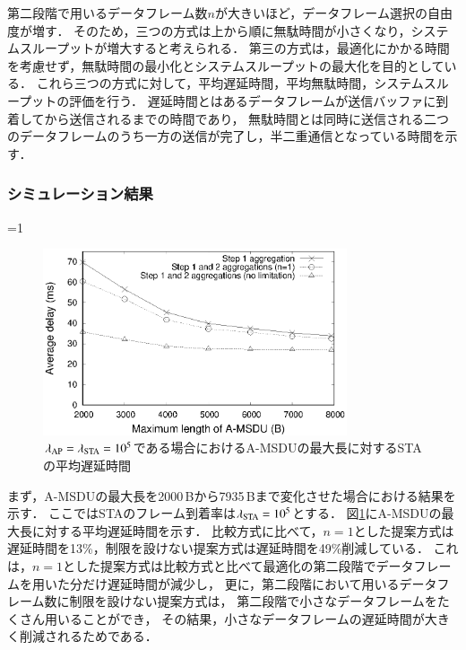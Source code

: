 \documentclass[master]{kuisthesis}		%
\newcounter{flagFig}
\begin{document}
			第二段階で用いるデータフレーム数$n$が大きいほど，データフレーム選択の自由度が増す．
			そのため，三つの方式は上から順に無駄時間が小さくなり，システムスループットが増大すると考えられる．
			第三の方式は，最適化にかかる時間を考慮せず，無駄時間の最小化とシステムスループットの最大化を目的としている．
			これら三つの方式に対して，平均遅延時間，平均無駄時間，システムスループットの評価を行う．
			遅延時間とはあるデータフレームが送信バッファに到着してから送信されるまでの時間であり，
			無駄時間とは同時に送信される二つのデータフレームのうち一方の送信が完了し，半二重通信となっている時間を示す．

		\subsubsection{シミュレーション結果}
			\ifnum\value{flagFig}=1 {\begin{figure}[htbp]
				\begin{center}
					\includegraphics[width=0.8\textwidth]{graph/dly_max.eps}
					\caption{$\lambda_{\rm AP}=\lambda_{\rm STA}=10^5$である場合におけるA-MSDUの最大長に対するSTAの平均遅延時間}
					\label{fig:dly_max}
				\end{center}
			\end{figure}}\fi
			まず，A-MSDUの最大長を2000\,Bから7935\,Bまで変化させた場合における結果を示す．
			ここではSTAのフレーム到着率は$\lambda_{\rm STA}=10^5$とする．
			図\ref{fig:dly_max}にA-MSDUの最大長に対する平均遅延時間を示す．
			比較方式に比べて，$n=1$とした提案方式は遅延時間を13\%，制限を設けない提案方式は遅延時間を49\%削減している．
			これは，$n=1$とした提案方式は比較方式と比べて最適化の第二段階でデータフレームを用いた分だけ遅延時間が減少し，
			更に，第二段階において用いるデータフレーム数に制限を設けない提案方式は，
			第二段階で小さなデータフレームをたくさん用いることができ，
			その結果，小さなデータフレームの遅延時間が大きく削減されるためである．
			\par
\end{document}
